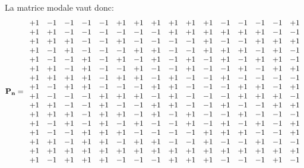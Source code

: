 \medskip
La matrice modale vaut donc:
\[
\MM{P_n} = \MM{\begin{array}{cccccccccccccccc}
+1 &-1 &-1 &-1 &-1 &+1 &+1 &+1 &+1 &+1 &+1 &-1  &-1  &-1  &-1  &+1\\
+1 &+1 &-1 &-1 &-1 &-1 &-1 &-1 &+1 &+1 &+1 &+1  &+1  &+1  &-1  &-1\\
+1 &+1 &+1 &-1 &-1 &+1 &-1 &-1 &-1 &-1 &+1 &-1  &-1  &+1  &+1  &+1\\
+1 &-1 &+1 &-1 &-1 &-1 &+1 &+1 &-1 &-1 &+1 &+1  &+1  &-1  &+1  &-1\\
+1 &-1 &-1 &+1 &-1 &+1 &-1 &+1 &-1 &+1 &-1 &+1  &-1  &+1  &+1  &-1\\
+1 &+1 &-1 &+1 &-1 &-1 &+1 &-1 &-1 &+1 &-1 &-1  &+1  &-1  &+1  &+1\\
+1 &+1 &+1 &+1 &-1 &+1 &+1 &-1 &+1 &-1 &-1 &+1  &-1  &-1  &-1  &-1\\
+1 &-1 &+1 &+1 &-1 &-1 &-1 &+1 &+1 &-1 &-1 &-1  &+1  &+1  &-1  &+1\\
+1 &-1 &-1 &-1 &+1 &+1 &+1 &-1 &+1 &-1 &-1 &-1  &+1  &+1  &+1  &-1\\
+1 &+1 &-1 &-1 &+1 &-1 &-1 &+1 &+1 &-1 &-1 &+1  &-1  &-1  &+1  &+1\\
+1 &+1 &+1 &-1 &+1 &+1 &-1 &+1 &-1 &+1 &-1 &-1  &+1  &-1  &-1  &-1\\
+1 &-1 &+1 &-1 &+1 &-1 &+1 &-1 &-1 &+1 &-1 &+1  &-1  &+1  &-1  &+1\\
+1 &-1 &-1 &+1 &+1 &+1 &-1 &-1 &-1 &-1 &+1 &+1  &+1  &-1  &-1  &+1\\
+1 &+1 &-1 &+1 &+1 &-1 &+1 &+1 &-1 &-1 &+1 &-1  &-1  &+1  &-1  &-1\\
+1 &+1 &+1 &+1 &+1 &+1 &+1 &+1 &+1 &+1 &+1 &+1  &+1  &+1  &+1  &+1\\
+1 &-1 &+1 &+1 &+1 &-1 &-1 &-1 &+1 &+1 &+1 &-1  &-1  &-1  &+1  &-1
\end{array}}
\]

